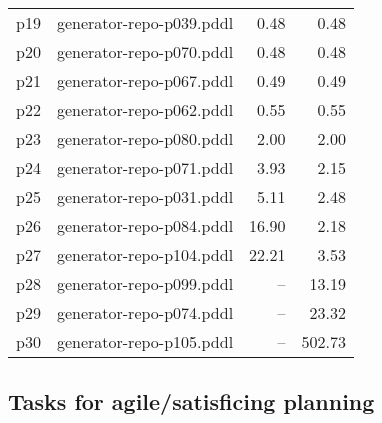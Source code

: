 \documentclass{article}
\begin{document}
\begin{center}
\begin{tabular}{@{}l|r|r|r@{}}
  p19& generator-repo-p039.pddl&0.48&0.48\\
  p20& generator-repo-p070.pddl&0.48&0.48\\
  p21& generator-repo-p067.pddl&0.49&0.49\\
  p22& generator-repo-p062.pddl&0.55&0.55\\
  p23& generator-repo-p080.pddl&2.00&2.00\\
  p24& generator-repo-p071.pddl&3.93&2.15\\
  p25& generator-repo-p031.pddl&5.11&2.48\\
  p26& generator-repo-p084.pddl&16.90&2.18\\
  p27& generator-repo-p104.pddl&22.21&3.53\\
  p28& generator-repo-p099.pddl&--&13.19\\
  p29& generator-repo-p074.pddl&--&23.32\\
  p30& generator-repo-p105.pddl&--&502.73
                            \end{tabular}
                            \end{center}
                    

                    \subsection*{Tasks for agile/satisficing planning}
                    
\end{document}
